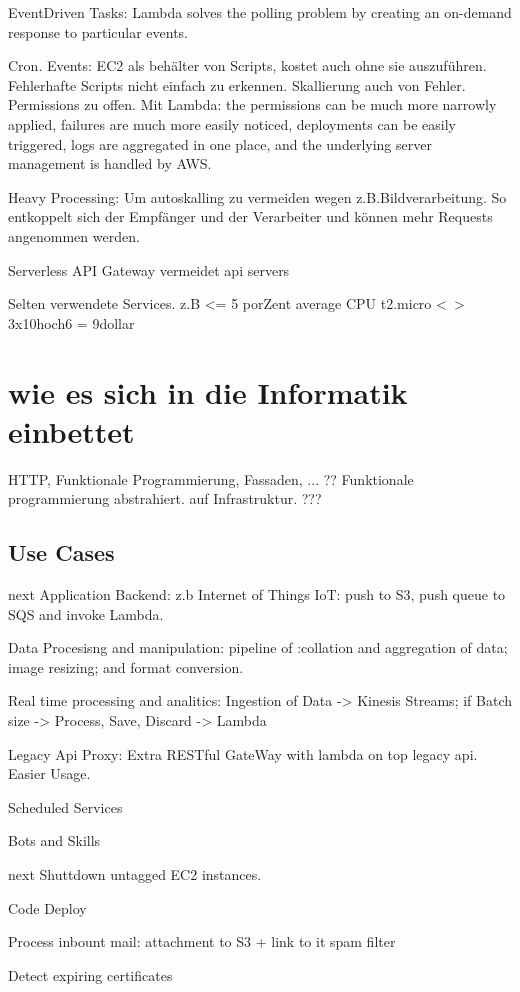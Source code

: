 \documentclass[
12pt,
english,
ngerman,
headsepline,
twoside,
openright,
numbers=noenddot,version=first
]{scrreprt}
\begin{document}
EventDriven Tasks: Lambda solves the polling problem by creating an on-demand response to particular events.

Cron. Events: EC2 als behälter von Scripts, kostet auch ohne sie auszuführen. Fehlerhafte Scripts nicht einfach zu erkennen. Skallierung auch von Fehler. Permissions zu offen.
Mit Lambda: the permissions can be much more narrowly applied, failures are much more easily noticed, deployments can be easily triggered, logs are aggregated in one place, and the underlying server management is handled by AWS.

Heavy Processing: Um autoskalling zu vermeiden wegen z.B.Bildverarbeitung. So entkoppelt sich der Empfänger und der Verarbeiter und können mehr Requests angenommen werden. 

Serverless API Gateway vermeidet api servers

Selten verwendete Services. z.B <= 5 porZent average CPU t2.micro <~> 3x10hoch6 = 9dollar

\chapter{wie es sich in die Informatik einbettet}
HTTP, Funktionale Programmierung, Fassaden, ... ?? 
Funktionale programmierung abstrahiert. auf Infrastruktur. ??? 

\section{Use Cases}
next\cite{serverlessArchAWS}
Application Backend: z.b Internet of Things IoT: push to S3, push queue to SQS and invoke Lambda.

Data Procesisng and manipulation: pipeline of :collation and aggregation of data; image resizing;
and format conversion.

Real time processing and analitics: Ingestion of Data -> Kinesis Streams; if Batch size -> Process, Save, Discard -> Lambda

Legacy Api Proxy: Extra RESTful GateWay with lambda on top legacy api. Easier Usage.

Scheduled Services

Bots and Skills

next\cite{lambdaAWS}
Shuttdown untagged EC2 instances. 

Code Deploy

Process inbount mail: 
attachment to S3 + link to it
spam filter

Detect expiring certificates
\end{document}

